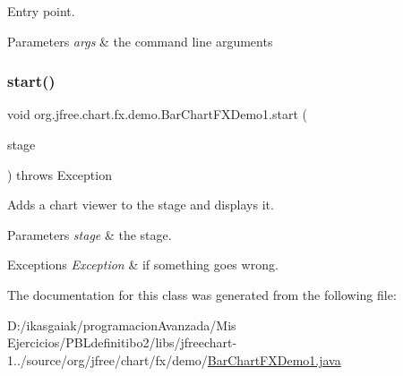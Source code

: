 Entry point.


\begin{DoxyParams}{Parameters}
{\em args} & the command line arguments \\
\hline
\end{DoxyParams}
\mbox{\label{classorg_1_1jfree_1_1chart_1_1fx_1_1demo_1_1_bar_chart_f_x_demo1_a3607e57deabde0c638321318b0455ff9}} 
\subsubsection{\texorpdfstring{start()}{start()}}
{\footnotesize\ttfamily void org.\+jfree.\+chart.\+fx.\+demo.\+Bar\+Chart\+F\+X\+Demo1.\+start (\begin{DoxyParamCaption}\item[{Stage}]{stage }\end{DoxyParamCaption}) throws Exception}

Adds a chart viewer to the stage and displays it.


\begin{DoxyParams}{Parameters}
{\em stage} & the stage. \\
\hline
\end{DoxyParams}

\begin{DoxyExceptions}{Exceptions}
{\em Exception} & if something goes wrong. \\
\hline
\end{DoxyExceptions}


The documentation for this class was generated from the following file\+:\begin{DoxyCompactItemize}
\item 
D\+:/ikasgaiak/programacion\+Avanzada/\+Mis Ejercicios/\+P\+B\+Ldefinitibo2/libs/jfreechart-\/1../source/org/jfree/chart/fx/demo/\mbox{\hyperlink{_bar_chart_f_x_demo1_8java}{Bar\+Chart\+F\+X\+Demo1.\+java}}\end{DoxyCompactItemize}
